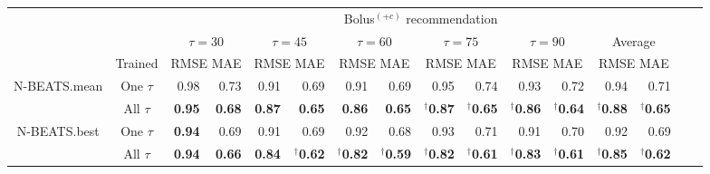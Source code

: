 \begin{table}[ht]
\begin{center}
\begin{tabular}{|c|c|rr|rr|rr|rr|rr|rr|rr}
    \cline{3-14}
    \multicolumn{2}{c|}{} & \multicolumn{12}{c|}{Bolus$^{(+c)}$ recommendation}\\
    \cline{3-14}
    \multicolumn{2}{c|}{} & \multicolumn{2}{c|}{$\tau=30$} & \multicolumn{2}{c|}{$\tau=45$} & \multicolumn{2}{c|}{$\tau=60$} & \multicolumn{2}{c|}{$\tau=75$} & \multicolumn{2}{c|}{$\tau=90$} & \multicolumn{2}{c|}{Average}\\
    \cline{2-14}
     \multicolumn{1}{c|}{}& Trained & \multicolumn{2}{c|}{\scriptsize RMSE MAE} & \multicolumn{2}{c|}{\scriptsize RMSE MAE} & \multicolumn{2}{c|}{\scriptsize RMSE MAE} & \multicolumn{2}{c|}{\scriptsize RMSE MAE} & \multicolumn{2}{c|}{\scriptsize RMSE MAE} & \multicolumn{2}{c|}{\scriptsize RMSE MAE} \\
    \hline
    \multirow{2}{*}{N-BEATS.mean} & One $\tau$ & 0.98 & 0.73 & 0.91 & 0.69 & 0.91 & 0.69 & 0.95 & 0.74 & 0.93 & 0.72 & 0.94 & 0.71\\
    & All $\tau$ & {\bf 0.95} & {\bf 0.68} & {\bf 0.87} & {\bf 0.65} & {\bf 0.86} & {\bf 0.65} & $^\dagger${\bf 0.87} & $^\dagger${\bf 0.65} & $^\dagger${\bf 0.86} & $^\dagger${\bf 0.64} & $^\dagger${\bf 0.88} & $^\dagger${\bf 0.65}\\
    \hline
    \multirow{2}{*}{N-BEATS.best} & One $\tau$ & {\bf 0.94} & 0.69 & 0.91 & 0.69 & 0.92 & 0.68 & 0.93 & 0.71 & 0.91 & 0.70 & 0.92 & 0.69\\
    & All $\tau$ & {\bf 0.94} & {\bf 0.66} & {\bf 0.84} & $^\dagger${\bf 0.62} & $^\dagger${\bf 0.82} & $^\dagger${\bf 0.59} & $^\dagger${\bf 0.82} & $^\dagger${\bf 0.61} & $^\dagger${\bf 0.83} & $^\dagger${\bf 0.61} & $^\dagger${\bf 0.85} & $^\dagger${\bf 0.62}\\
    \hline
\end{tabular}
\end{center}
\end{table}